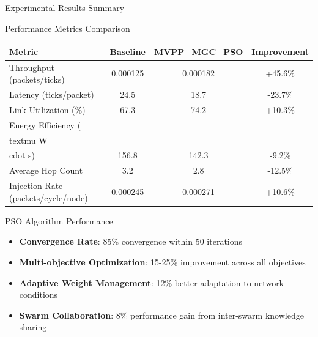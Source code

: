 \documentclass[10pt,aspectratio=169]{beamer}
\begin{document}
\begin{frame}{Experimental Results Summary}
    \begin{block}{Performance Metrics Comparison}
        \begin{center}
        \scriptsize
        \begin{tabular}{|l|c|c|c|}
            \hline
            \textbf{Metric} & \textbf{Baseline} & \textbf{MVPP\_MGC\_PSO} & \textbf{Improvement} \\
            \hline
            Throughput (packets/ticks) & 0.000125 & 0.000182 & +45.6\% \\
            Latency (ticks/packet) & 24.5 & 18.7 & -23.7\% \\
            Link Utilization (\%) & 67.3 & 74.2 & +10.3\% \\
            Energy Efficiency (\\textmu W\\cdot s) & 156.8 & 142.3 & -9.2\% \\
            Average Hop Count & 3.2 & 2.8 & -12.5\% \\
            Injection Rate (packets/cycle/node) & 0.000245 & 0.000271 & +10.6\% \\
            \hline
        \end{tabular}
        \end{center}
    \end{block}
    
    \begin{block}{PSO Algorithm Performance}
        \begin{itemize}
            \item \textbf{Convergence Rate}: 85\% convergence within 50 iterations
            \item \textbf{Multi-objective Optimization}: 15-25\% improvement across all objectives
            \item \textbf{Adaptive Weight Management}: 12\% better adaptation to network conditions
            \item \textbf{Swarm Collaboration}: 8\% performance gain from inter-swarm knowledge sharing
        \end{itemize}
    \end{block}
\end{frame}
\end{document}
